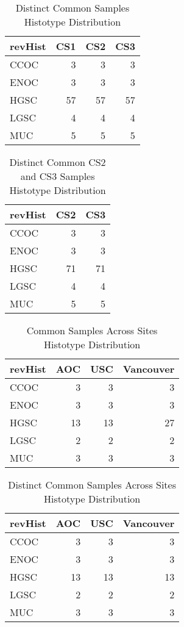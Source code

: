 \documentclass[
]{report}
\begin{document}
\begin{table}

\caption{\label{tab:common-dist-distinct}Distinct Common Samples Histotype Distribution}
\centering
\begin{tabular}[t]{l|r|r|r}
\hline
revHist & CS1 & CS2 & CS3\\
\hline
CCOC & 3 & 3 & 3\\
\hline
ENOC & 3 & 3 & 3\\
\hline
HGSC & 57 & 57 & 57\\
\hline
LGSC & 4 & 4 & 4\\
\hline
MUC & 5 & 5 & 5\\
\hline
\end{tabular}
\end{table}

\begin{table}

\caption{\label{tab:common-cs2-cs3-dist-distinct}Distinct Common CS2 and CS3 Samples Histotype Distribution}
\centering
\begin{tabular}[t]{l|r|r}
\hline
revHist & CS2 & CS3\\
\hline
CCOC & 3 & 3\\
\hline
ENOC & 3 & 3\\
\hline
HGSC & 71 & 71\\
\hline
LGSC & 4 & 4\\
\hline
MUC & 5 & 5\\
\hline
\end{tabular}
\end{table}

\begin{table}

\caption{\label{tab:common-dist-sites}Common Samples Across Sites Histotype Distribution}
\centering
\begin{tabular}[t]{l|r|r|r}
\hline
revHist & AOC & USC & Vancouver\\
\hline
CCOC & 3 & 3 & 3\\
\hline
ENOC & 3 & 3 & 3\\
\hline
HGSC & 13 & 13 & 27\\
\hline
LGSC & 2 & 2 & 2\\
\hline
MUC & 3 & 3 & 3\\
\hline
\end{tabular}
\end{table}

\begin{table}

\caption{\label{tab:common-dist-sites-distinct}Distinct Common Samples Across Sites Histotype Distribution}
\centering
\begin{tabular}[t]{l|r|r|r}
\hline
revHist & AOC & USC & Vancouver\\
\hline
CCOC & 3 & 3 & 3\\
\hline
ENOC & 3 & 3 & 3\\
\hline
HGSC & 13 & 13 & 13\\
\hline
LGSC & 2 & 2 & 2\\
\hline
MUC & 3 & 3 & 3\\
\hline
\end{tabular}
\end{table}
\end{document}
